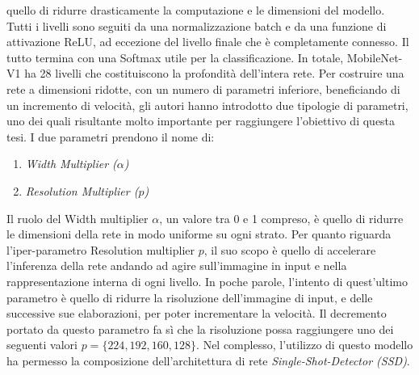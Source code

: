 quello di ridurre drasticamente la computazione e le dimensioni del modello. 
Tutti i livelli sono seguiti da una normalizzazione batch e da una funzione 
di attivazione ReLU, ad eccezione del livello finale che è completamente 
connesso. Il tutto termina con una Softmax utile per la classificazione. In 
totale, MobileNet-V1 ha 28 livelli che costituiscono la profondità dell'intera 
rete. Per costruire una rete a dimensioni ridotte, con un numero di parametri 
inferiore, beneficiando di un incremento di velocità, gli autori hanno introdotto 
due tipologie di parametri, uno dei quali risultante molto importante 
per raggiungere l'obiettivo di questa tesi. I  due parametri prendono il nome 
di: 
\begin{enumerate}
    \item \emph{Width Multiplier ($\alpha$)}
    \item \emph{Resolution Multiplier ($p$)}
\end{enumerate}
Il ruolo del Width multiplier $\alpha$, un valore tra 0 e 1 compreso, è quello di 
ridurre le dimensioni della rete in modo uniforme su ogni strato. Per quanto 
riguarda l'iper-parametro Resolution multiplier $p$,  il suo scopo è quello di 
accelerare l'inferenza della rete andando ad agire sull'immagine in input e 
nella rappresentazione interna di ogni livello. In poche parole, l'intento di 
quest'ultimo parametro è quello di ridurre la  risoluzione dell'immagine di 
input, e delle successive sue elaborazioni, per poter incrementare la velocità. 
Il decremento portato da questo parametro fa sì che la risoluzione possa 
raggiungere uno dei seguenti valori $p=\{224, 192, 160, 128\}$. Nel complesso, 
l'utilizzo di questo modello ha permesso la composizione dell'architettura di 
rete \emph{Single-Shot-Detector (SSD)}. 

